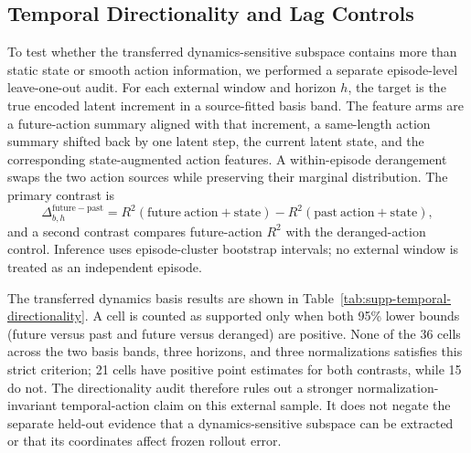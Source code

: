 \documentclass{article}
\begin{document}
\subsection{Temporal Directionality and Lag Controls}
\label{sec:supp-temporal-directionality}

To test whether the transferred dynamics-sensitive subspace contains more
than static state or smooth action information, we performed a separate
episode-level leave-one-out audit. For each external window and horizon $h$,
the target is the true encoded latent increment in a source-fitted basis band.
The feature arms are a future-action summary aligned with that increment, a
same-length action summary shifted back by one latent step, the current latent
state, and the corresponding state-augmented action features. A within-episode
derangement swaps the two action sources while preserving their marginal
distribution. The primary contrast is
\begin{equation}
\Delta_{b,h}^{\mathrm{future-past}}
=R^2(\mathrm{future\ action}+\mathrm{state})
-R^2(\mathrm{past\ action}+\mathrm{state}),
\label{eq:supp-temporal-directionality}
\end{equation}
and a second contrast compares future-action $R^2$ with the deranged-action
control. Inference uses episode-cluster bootstrap intervals; no external
window is treated as an independent episode.

The transferred dynamics basis results are shown in
Table~\ref{tab:supp-temporal-directionality}. A cell is counted as supported
only when both 95\% lower bounds (future versus past and future versus
deranged) are positive. None of the 36 cells across the two basis bands,
three horizons, and three normalizations satisfies this strict criterion;
21 cells have positive point estimates for both contrasts, while 15 do not.
The directionality audit therefore rules out a stronger normalization-
invariant temporal-action claim on this external sample. It does not negate
the separate held-out evidence that a dynamics-sensitive subspace can be
extracted or that its coordinates affect frozen rollout error.
\end{document}
